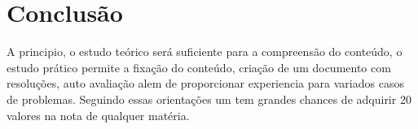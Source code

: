 \documentclass[12pt]{article}
\begin{document}
\section{Conclusão}
\quad A principio, o estudo teórico será suficiente para a compreensão do conteúdo, o estudo prático permite a fixação do conteúdo, criação de um documento com resoluções, auto avaliação alem de proporcionar experiencia para variados casos de problemas. Seguindo essas orientações um tem grandes chances de adquirir 20 valores na nota de qualquer matéria.
\end{document}
